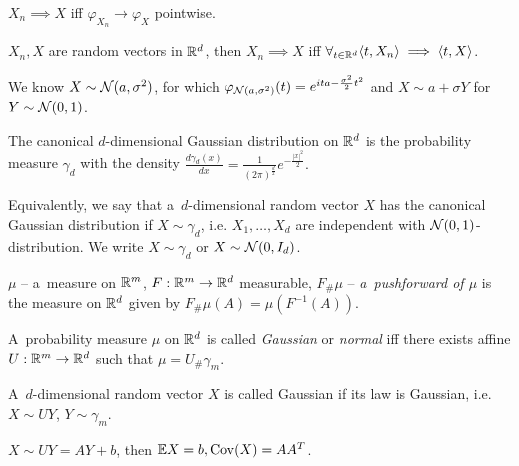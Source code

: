 



	\begin{theorem}
		$X_n \implies X$ iff $\varphi_{X_n} \to \varphi_X$ pointwise.
	\end{theorem}
	
	\begin{corollary}
		$X_n, X$ are random vectors in $\mathbb{R}^d$, then $X_n \implies X$ iff $\forall_{t \in \mathbb{R}^d} \langle t, X_n\rangle \implies \langle t,X\rangle$.
	\end{corollary}
	
	\begin{remark}
		We know $X \sim \mathcal{N}(a, \sigma^2)$, for which $\varphi_{\mathcal{N}(a,\sigma^2)}(t) = e^{ita - \frac{\sigma^2}{2} t^2}$ and $X \sim a + \sigma Y$ for $Y \sim \mathcal{N}(0,1)$.
	\end{remark}
	
	\begin{definition}
		The canonical $d$-dimensional Gaussian distribution on $\mathbb{R}^d$ is the probability measure $\gamma_d$ with the density $\displaystyle \frac{d \gamma_d(x)}{dx} = \frac{1}{(2 \pi)^{\frac{d}{2}}} e^{-\frac{|x|^2}{2}}.$
		
		Equivalently, we say that a~$d$-dimensional random vector $X$ has the canonical Gaussian distribution if $X \sim \gamma_d$, i.e. $X_1, \ldots, X_d$ are independent with $\mathcal{N}(0,1)$-distribution. We write $X \sim \gamma_d$ or $X \sim \mathcal{N}(0,I_d)$.
	\end{definition}
	
	\begin{definition}[pushforward]
		$\mu$ -- a~measure on $\mathbb{R}^m$, $F:\mathbb{R}^m \to \mathbb{R}^d$ measurable, $F_\# \mu$ -- \emph{a~pushforward of $\mu$} is the measure on $\mathbb{R}^d$ given by $F_\# \mu(A) = \mu(F^{-1}(A))$.
	\end{definition}
	
	\begin{definition}
		A~probability measure $\mu$ on $\mathbb{R}^d$ is called \emph{Gaussian} or \emph{normal} iff there exists affine $U:\mathbb{R}^m \to \mathbb{R}^d$ such that $\mu = U_\# \gamma_m$.
		
		A~$d$-dimensional random vector $X$ is called Gaussian if its law is Gaussian, i.e. $X \sim U Y$, $Y \sim \gamma_m$.
	\end{definition}
	
	\begin{remark}
		$X \sim UY = AY + b$, then $\mathbb{E} X = b, \mathrm{Cov}(X) = A A^T$.
	\end{remark}
	
